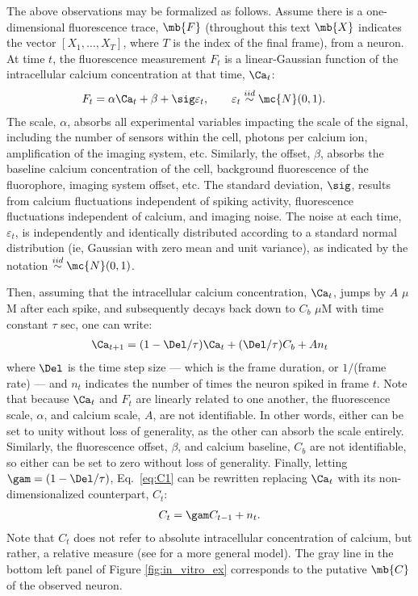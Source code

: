 The above observations may be formalized as follows. Assume there is a one-dimensional fluorescence trace, $\mb{F}$ (throughout this text $\mb{X}$ indicates the vector $[X_1, \ldots, X_T]$, where $T$ is the index of the final frame), from a neuron.  At time $t$, the fluorescence measurement $F_t$ is a linear-Gaussian function of the intracellular calcium concentration at that time, $\Ca_t$:
\begin{align} \label{eq:F}
F_t &= \alpha \Ca_t + \beta + \sig \varepsilon_t, \qquad \varepsilon_t \overset{iid}{\sim} \mc{N}(0,1).
\end{align}
\noindent The scale, $\alpha$, absorbs all experimental variables impacting the scale of the signal, including the number of sensors within the cell, photons per calcium ion, amplification of the imaging system, etc.  Similarly, the offset, $\beta$, absorbs the baseline calcium concentration of the cell, background fluorescence of the fluorophore, imaging system offset, etc.  The standard deviation, $\sig$, results from calcium fluctuations independent of spiking activity, fluorescence fluctuations independent of calcium, and imaging noise. The noise at each time, $\varepsilon_t$, is independently and identically distributed according to a standard normal distribution (ie, Gaussian with zero mean and unit variance), as indicated by the notation $\overset{iid}{\sim}\mc{N}(0,1)$. 

Then, assuming that the intracellular calcium concentration, $\Ca_t$, jumps by $A$ $\mu$M after each spike, and subsequently decays back down to $C_b$ $\mu$M with time constant $\tau$ sec, one can write:
\begin{align} \label{eq:C1}
\Ca_{t+1} = (1- \Del/\tau ) \Ca_t + (\Del/\tau) C_b + A n_t
\end{align}
\noindent where $\Del$ is the time step size --- which is the frame duration, or $1/$(frame rate) --- and $n_t$ indicates the number of times the neuron spiked in frame $t$. %
Note that because $\Ca_t$ and $F_t$ are linearly related to one another, the fluorescence scale, $\alpha$, and calcium scale, $A$, are not identifiable.  In other words, either can be set to unity without loss of generality, as the other can absorb the scale entirely. Similarly, the fluorescence offset, $\beta$, and calcium baseline, $C_b$ are not identifiable, so either can be set to zero without loss of generality.  Finally, letting $\gam=(1-\Del/\tau)$, Eq.~\eqref{eq:C1} can be rewritten replacing $\Ca_t$ with its non-dimensionalized counterpart, $C_t$: 
\begin{align} \label{eq:C2}
	 C_t =\gam C_{t-1} + n_t.
\end{align} 
\noindent Note that $C_t$ does not refer to absolute intracellular concentration of calcium, but rather, a relative measure (see \cite{VogelsteinPaninski09} for a more general model).  The gray line in the bottom left panel of Figure \ref{fig:in_vitro_ex} corresponds to the putative $\mb{C}$ of the observed neuron.  

